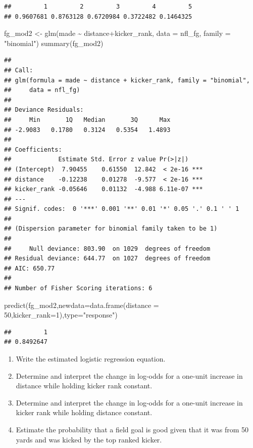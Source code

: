 \documentclass[
  11pt,
]{book}
\newenvironment{Shaded}{\begin{snugshade}}{\end{snugshade}}
\newcommand{\AttributeTok}[1]{\textcolor[rgb]{0.77,0.63,0.00}{#1}}
\newcommand{\DecValTok}[1]{\textcolor[rgb]{0.00,0.00,0.81}{#1}}
\newcommand{\FunctionTok}[1]{\textcolor[rgb]{0.00,0.00,0.00}{#1}}
\newcommand{\NormalTok}[1]{#1}
\newcommand{\OtherTok}[1]{\textcolor[rgb]{0.56,0.35,0.01}{#1}}
\newcommand{\SpecialCharTok}[1]{\textcolor[rgb]{0.00,0.00,0.00}{#1}}
\newcommand{\StringTok}[1]{\textcolor[rgb]{0.31,0.60,0.02}{#1}}
\theoremstyle{definition}
\theoremstyle{definition}
\theoremstyle{definition}
\theoremstyle{definition}
\theoremstyle{remark}
\begin{document}
\begin{verbatim}
##         1         2         3         4         5 
## 0.9607681 0.8763128 0.6720984 0.3722482 0.1464325
\end{verbatim}

\newpage

\begin{Shaded}
\begin{Highlighting}[]
\NormalTok{fg\_mod2 }\OtherTok{\textless{}{-}} \FunctionTok{glm}\NormalTok{(made }\SpecialCharTok{\textasciitilde{}}\NormalTok{ distance}\SpecialCharTok{+}\NormalTok{kicker\_rank, }\AttributeTok{data =}\NormalTok{ nfl\_fg, }\AttributeTok{family =} \StringTok{"binomial"}\NormalTok{)}
\FunctionTok{summary}\NormalTok{(fg\_mod2)}
\end{Highlighting}
\end{Shaded}

\begin{verbatim}
## 
## Call:
## glm(formula = made ~ distance + kicker_rank, family = "binomial", 
##     data = nfl_fg)
## 
## Deviance Residuals: 
##     Min       1Q   Median       3Q      Max  
## -2.9083   0.1780   0.3124   0.5354   1.4893  
## 
## Coefficients:
##             Estimate Std. Error z value Pr(>|z|)    
## (Intercept)  7.90455    0.61550  12.842  < 2e-16 ***
## distance    -0.12238    0.01278  -9.577  < 2e-16 ***
## kicker_rank -0.05646    0.01132  -4.988 6.11e-07 ***
## ---
## Signif. codes:  0 '***' 0.001 '**' 0.01 '*' 0.05 '.' 0.1 ' ' 1
## 
## (Dispersion parameter for binomial family taken to be 1)
## 
##     Null deviance: 803.90  on 1029  degrees of freedom
## Residual deviance: 644.77  on 1027  degrees of freedom
## AIC: 650.77
## 
## Number of Fisher Scoring iterations: 6
\end{verbatim}

\begin{Shaded}
\begin{Highlighting}[]
\FunctionTok{predict}\NormalTok{(fg\_mod2,}\AttributeTok{newdata=}\FunctionTok{data.frame}\NormalTok{(}\AttributeTok{distance =} \DecValTok{50}\NormalTok{,}\AttributeTok{kicker\_rank=}\DecValTok{1}\NormalTok{),}\AttributeTok{type=}\StringTok{"response"}\NormalTok{)}
\end{Highlighting}
\end{Shaded}

\begin{verbatim}
##         1 
## 0.8492647
\end{verbatim}

\begin{enumerate}
\def\labelenumi{(\alph{enumi})}
\item
  Write the estimated logistic regression equation.~\vfill
\item
  Determine and interpret the change in log-odds for a one-unit increase in distance while holding kicker rank constant.~\vfill
\item
  Determine and interpret the change in log-odds for a one-unit increase in kicker rank while holding distance constant.~\vfill
\item
  Estimate the probability that a field goal is good given that it was from 50 yards and was kicked by the top ranked kicker. ~\vfill
\end{enumerate}
\end{document}
